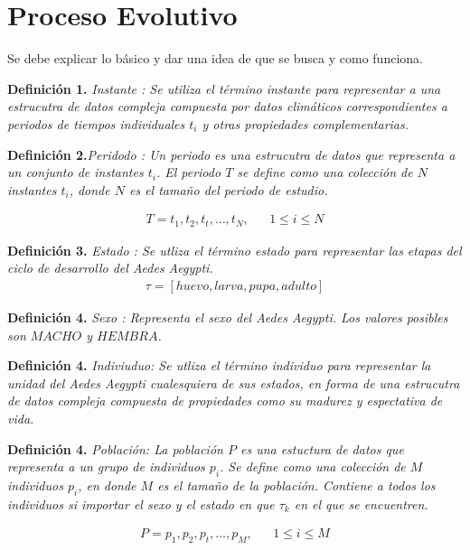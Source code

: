 \section{Proceso Evolutivo}

Se debe explicar lo básico y dar una idea de que se busca y como funciona.


\textbf{Definición 1.} \em Instante \em : Se utiliza el término instante
    para representar a una estrucutra de datos compleja compuesta por
    datos climáticos correspondientes a periodos de tiempos individuales
    $t_{i}$ y otras propiedades complementarias.


\textbf{Definición 2.}\em Peridodo \em : Un periodo es una estrucutra de
    datos que representa a un conjunto de instantes $t_{i}$. El periodo
    $T$  se define como una colección de $N$ instantes
    $t_{i}$, donde $N$ es el tamaño del periodo de estudio.

    \begin{align*}
        T = t_1,t_2,t_t,\ldots,t_N , & & 1 \leq i \leq N
    \end{align*}


\textbf{Definición 3.} \em Estado \em : Se utliza el término estado
    para representar las etapas del ciclo de desarrollo del \em Aedes Aegypti\em.
    \begin{align*}
        \tau = [huevo, larva, pupa, adulto]
    \end{align*}

\textbf{Definición 4.} \em Sexo \em : Representa el sexo del \em Aedes
    Aegypti\em. Los valores posibles son $MACHO$ y $HEMBRA$.

\textbf{Definición 4.} \em Indiviuduo\em : Se utliza el término individuo
    para representar la unidad del \em Aedes Aegypti \em cualesquiera de sus
    estados, en forma de una estrucutra de datos compleja compuesta de
    propiedades como su madurez y espectativa de vida.

\textbf{Definición 4.} \em Población\em : La población $P$ es una estuctura
    de datos que representa a un grupo de individuos $p_{i}$. Se define como
    una colección de $M$ individuos $p_{i}$, en donde $M$ es el tamaño de
    la población. Contiene a todos los individuos si importar el sexo  y el
    estado en que $\tau_{k}$ en el que se encuentren.

    \begin{align*}
        P = p_1,p_2,p_t,\ldots,p_M,  & & 1 \leq i \leq M
    \end{align*}

